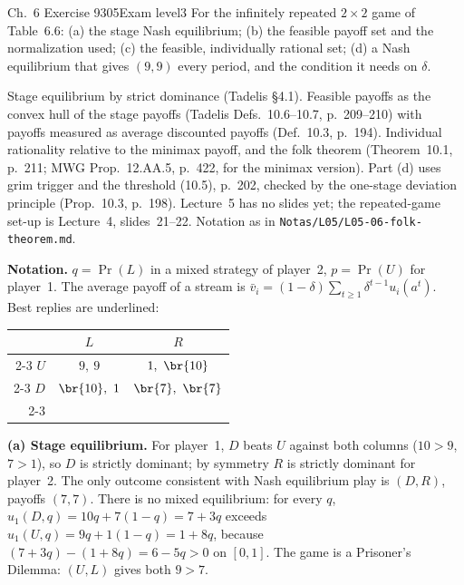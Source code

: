 \begin{exsol}{\MG{} Ch.~6 Exercise 9}{305}{Exam level}{3}
\asked For the infinitely repeated $2\times2$ game of Table~6.6: (a) the stage Nash equilibrium;
(b) the feasible payoff set and the normalization used; (c) the feasible, individually rational
set; (d) a Nash equilibrium that gives $(9,9)$ every period, and the condition it needs on $\delta$.

\method Stage equilibrium by strict dominance (Tadelis \S4.1). Feasible payoffs as the convex hull
of the stage payoffs (Tadelis Defs.~10.6--10.7, p.~209--210) with payoffs measured as average
discounted payoffs (Def.~10.3, p.~194). Individual rationality relative to the minimax payoff, and
the folk theorem (Theorem~10.1, p.~211; MWG Prop.~12.AA.5, p.~422, for the minimax version). Part
(d) uses grim trigger and the threshold (10.5), p.~202, checked by the one-stage deviation principle
(Prop.~10.3, p.~198). Lecture~5 has no slides yet; the repeated-game set-up is Lecture~4,
slides~21--22. Notation as in \texttt{Notas/L05/L05-06-folk-theorem.md}.

\solution
\textbf{Notation.} $q = \Pr(L)$ in a mixed strategy of player~2, $p = \Pr(U)$ for player~1. The
average payoff of a stream is $\bar v_i = (1-\delta)\sum_{t\ge1}\delta^{t-1}u_i(a^t)$. Best replies
are underlined:
\begin{center}
\begin{tabular}{r|c|c|}
\multicolumn{1}{r}{} & \multicolumn{1}{c}{$L$} & \multicolumn{1}{c}{$R$}\\ \cline{2-3}
$U$ & $9,\ 9$ & $1,\ \br{10}$ \\ \cline{2-3}
$D$ & $\br{10},\ 1$ & $\br{7},\ \br{7}$ \\ \cline{2-3}
\end{tabular}
\end{center}

\textbf{(a) Stage equilibrium.} For player~1, $D$ beats $U$ against both columns ($10>9$, $7>1$),
so $D$ is strictly dominant; by symmetry $R$ is strictly dominant for player~2. The only outcome
consistent with Nash equilibrium play is $(D,R)$, payoffs $(7,7)$. There is no mixed equilibrium:
for every $q$, $u_1(D,q) = 10q + 7(1-q) = 7 + 3q$ exceeds $u_1(U,q) = 9q + 1(1-q) = 1 + 8q$, because
$(7+3q) - (1+8q) = 6 - 5q > 0$ on $[0,1]$. The game is a Prisoner's Dilemma: $(U,L)$ gives both
$9 > 7$.


\end{exsol}
